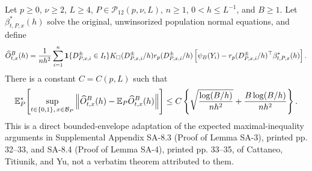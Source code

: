 Let \(p\geq0\), \(\nu\geq2\), \(L\geq4\), \(P\in\mathcal P_{12}(p,\nu,L)\), \(n\geq1\), \(0<h\leq L^{-1}\), and \(B\geq1\).  Let \(\beta^*_{t,P,x}(h)\) solve the original, unwinsorized population normal equations, and define
\[
 \widehat O^B_{t,x}(h)={1\over nh^2}\sum_{i=1}^n
 \mathbf1\{D^{\pm}_{P,x,i}\in I_t\}K_\square(D^{\pm}_{P,x,i}/h)
 r_p(D^{\pm}_{P,x,i}/h)
 \left[\psi_B(Y_i)-r_p(D^{\pm}_{P,x,i}/h)^\top\beta^*_{t,P,x}(h)\right].
\]
There is a constant \(C=C(p,L)\) such that
\[
 \mathbb E_P^*\!\left[
 \sup_{t\in\{0,1\},\,x\in\mathcal B_P}
 \left\|\widehat O^B_{t,x}(h)-\mathbb E_P\widehat O^B_{t,x}(h)\right\|
 \right]
 \leq C\left\{
 \sqrt{{\log(B/h)\over nh^2}}+{B\log(B/h)\over nh^2}
 \right\}.
\]
This is a direct bounded-envelope adaptation of the expected maximal-inequality arguments in Supplemental Appendix SA-8.3 (Proof of Lemma SA-3), printed pp. 32--33, and SA-8.4 (Proof of Lemma SA-4), printed pp. 33--35, of Cattaneo, Titiunik, and Yu, not a verbatim theorem attributed to them.